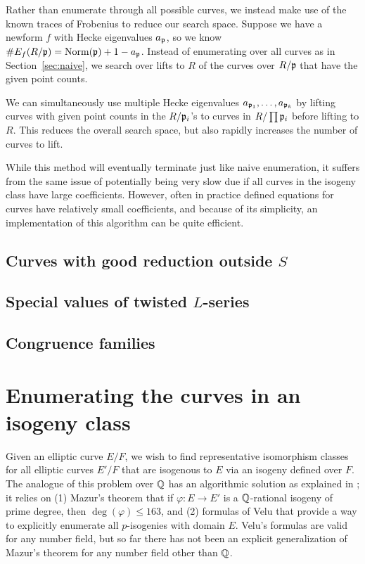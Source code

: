\documentclass{amsart}
\begin{document}
Rather than enumerate through all possible curves, we instead make use
of the known traces of Frobenius to reduce our search space. Suppose
we have a newform $f$ with Hecke eigenvalues $a_{\mathfrak{p}}$, so we know
$\#E_f(R/\mathfrak{p})=\operatorname{Norm}(\mathfrak{p})+1-a_{\mathfrak{p}}$. Instead of enumerating over all
curves as in Section~\ref{sec:naive}, we search over lifts to $R$ of the
curves over $R/\mathfrak{p}$ that have the given point counts.

We can simultaneously use multiple Hecke eigenvalues
$a_{\mathfrak{p}_1},\ldots,a_{\mathfrak{p}_k}$ by lifting curves with given point counts
in the $R/\mathfrak{p}_i$'s to curves in $R/\prod \mathfrak{p}_i$ before lifting to
$R$. This reduces the overall search space, but also rapidly increases
the number of curves to lift.

While this method will eventually terminate just like naive
enumeration, it suffers from the same issue of potentially being very
slow due if all curves in the isogeny class have large
coefficients. However, often in practice defined equations for curves
have relatively small coefficients, and because of its simplicity, an
implementation of this algorithm can be quite efficient. 


\subsection{Curves with good reduction outside $S$}

\subsection{Special values of twisted $L$-series}

\subsection{Congruence families}



\section{Enumerating the curves in an isogeny class}\label{sec:isoclass}

Given an elliptic curve $E/F$, we wish to find representative
isomorphism classes for all elliptic curves $E'/F$ that are isogenous
to $E$ via an isogeny defined over $F$.  The analogue of this problem
over $\mathbb{Q}$ has an algorithmic solution as explained in
\cite[\S3.8]{cremona:algs}; it relies on (1) Mazur's theorem
\cite{mazur:rational} that if $\varphi:E\to E'$ is a $\mathbb{Q}$-rational
isogeny of prime degree, then $\deg(\varphi)\leq 163$, and (2) formulas
of Velu \cite{velu:isogenies} that provide a way to explicitly
enumerate all $p$-isogenies with domain $E$.  Velu's formulas are
valid for any number field, but so far there has not been an explicit
generalization of Mazur's theorem for any number field other than
$\mathbb{Q}$.  
\end{document}
